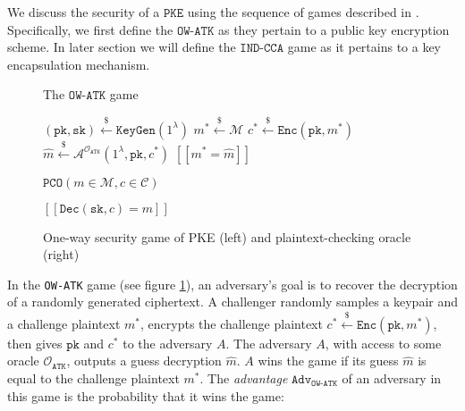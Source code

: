 \documentclass[journal=tches,submission]{iacrtrans}
\newcommand{\pke}{\texttt{PKE}}
\newcommand{\keygen}{\texttt{KeyGen}}
\newcommand{\encrypt}{\texttt{Enc}}
\newcommand{\decrypt}{\texttt{Dec}}
\newcommand{\pk}{\texttt{pk}}
\newcommand{\sk}{\texttt{sk}}
\newcommand{\pco}{\texttt{PCO}}
\newcommand{\leftsample}{\stackrel{\$}{\leftarrow}}
\newcommand{\llbrack}{[\![}
\newcommand{\rrbrack}{]\!]}
\newcommand{\adv}{\texttt{Adv}}
\begin{document}
We discuss the security of a $\pke$ using the sequence of games described in \cite{shoup2004sequences}. Specifically, we first define the $\texttt{OW-ATK}$ as they pertain to a public key encryption scheme. In later section we will define the $\texttt{IND-CCA}$ game as it pertains to a key encapsulation mechanism.

\def\algowatkgame{
    \begin{algorithm}[H]
        \caption*{The $\texttt{OW-ATK}$ game}
        \begin{algorithmic}[1]
            \State $(\pk, \sk) \leftsample \keygen(1^\lambda)$
            \State $m^\ast \leftsample \mathcal{M}$
            \State $c^\ast \leftsample \encrypt(\pk, m^\ast)$
            \State $\hat{m} \leftsample \mathcal{A}^{\mathcal{O}_\texttt{ATK}}(
                1^\lambda, \pk, c^\ast
            )$
            \State \Return $\llbrack m^\ast = \hat{m} \rrbrack$
        \end{algorithmic}
    \end{algorithm}
}
\def\algpco{
    \begin{algorithm}[H]
        \caption*{$\pco(m \in \mathcal{M}, c \in \mathcal{C})$}
        \begin{algorithmic}[1]
            \State \Return $\llbrack \decrypt(\sk, c) = m \rrbrack$
        \end{algorithmic}
    \end{algorithm}
}
\begin{figure}[H]
    \centering
    \begin{minipage}[b]{0.49\textwidth}
        \algowatkgame
    \end{minipage}
    \begin{minipage}[b]{0.49\textwidth}
        \algpco
    \end{minipage}
    \caption{
        One-way security game of PKE (left) and plaintext-checking oracle (right)
    }\label{fig:ow-game-pco}
\end{figure}

In the \texttt{OW-ATK} game (see figure \ref{fig:ow-game-pco}), an adversary's goal is to recover the decryption of a randomly generated ciphertext. A challenger randomly samples a keypair and a challenge plaintext $m^\ast$, encrypts the challenge plaintext $c^\ast \leftsample \encrypt(\pk, m^\ast)$, then gives $\pk$ and $c^\ast$ to the adversary $A$. The adversary $A$, with access to some oracle $\mathcal{O}_\texttt{ATK}$, outputs a guess decryption $\hat{m}$. $A$ wins the game if its guess $\hat{m}$ is equal to the challenge plaintext $m^\ast$. The \textit{advantage} $\adv_\texttt{OW-ATK}$ of an adversary in this game is the probability that it wins the game:
\end{document}
